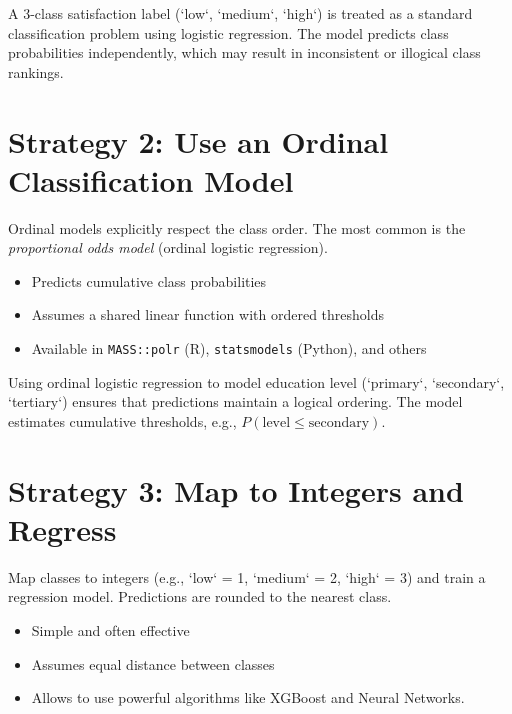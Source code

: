 \documentclass[12pt,openany]{book}
\begin{document}
\begin{examplebox}
A 3-class satisfaction label (`low`, `medium`, `high`) is treated as a
standard classification problem using logistic regression. The model
predicts class probabilities independently, which may result in
inconsistent or illogical class rankings.
\end{examplebox}

\vspace{5pt}

\section{Strategy 2: Use an Ordinal Classification Model}

Ordinal models explicitly respect the class order. The most common is
the \textit{proportional odds model} (ordinal logistic regression).

\begin{itemize}
    \item Predicts cumulative class probabilities
    \item Assumes a shared linear function with ordered thresholds
    \item Available in \texttt{MASS::polr} (R), 
          \texttt{statsmodels} (Python), and others
\end{itemize}

\begin{examplebox}
Using ordinal logistic regression to model education level (`primary`, 
`secondary`, `tertiary`) ensures that predictions maintain a logical 
ordering. The model estimates cumulative thresholds, e.g., 
$P(\text{level} \leq \text{secondary})$.
\end{examplebox}

\vspace{5pt}

\section{Strategy 3: Map to Integers and Regress}

Map classes to integers (e.g., `low` = 1, `medium` = 2, `high` = 3) and
train a regression model. Predictions are rounded to the nearest class.

\begin{itemize}
    \item Simple and often effective
    \item Assumes equal distance between classes
    \item Allows to use powerful algorithms like XGBoost and Neural Networks.
\end{itemize}
\end{document}
